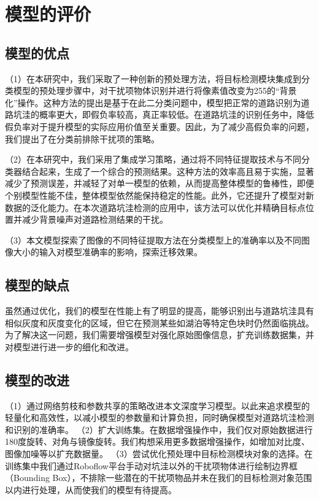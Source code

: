 \documentclass[a4paper, 10pt]{article}
\begin{document}
	\section{模型的评价}
	
	\subsection{模型的优点}
	
	（1）在本研究中，我们采取了一种创新的预处理方法，将目标检测模块集成到分类模型的预处理步骤中，对干扰项物体识别并进行将像素值改变为255的“背景化”操作。这种方法的提出是基于在此二分类问题中，模型把正常的道路识别为道路坑洼的概率更大，即假负率较高，真正率较低。在道路坑洼的识别任务中，降低假负率对于提升模型的实际应用价值至关重要。因此，为了减少高假负率的问题，我们提出了在分类前排除干扰项的策略。
	
	（2）在本研究中，我们采用了集成学习策略，通过将不同特征提取技术与不同分类器结合起来，生成了一个综合的预测结果。这种方法的效率高且易于实施，显著减少了预测误差，并减轻了对单一模型的依赖，从而提高整体模型的鲁棒性，即便个别模型性能不佳，整体模型依然能保持稳定的性能。此外，它还提升了模型对新数据的泛化能力。在本次道路坑洼检测的应用中，该方法可以优化并精确目标点位置并减少背景噪声对道路检测结果的干扰。
	
	（3）本文模型探索了图像的不同特征提取方法在分类模型上的准确率以及不同图像大小的输入对模型准确率的影响，探索迁移效果。
	
	
	\subsection{模型的缺点}
	
	虽然通过优化，我们的模型在性能上有了明显的提高，能够识别出与道路坑洼具有相似灰度和灰度变化的区域，但它在预测某些如湖泊等特定色块时仍然面临挑战。为了解决这一问题，我们需要增强模型对强化原始图像信息，扩充训练数据集，并对模型进行进一步的细化和改进。
	
	
	\subsection{模型的改进}

	（1）通过网络剪枝和参数共享的策略改进本文深度学习模型。以此来追求模型的轻量化和高效性，以减小模型的参数量和计算负担，同时确保模型对道路坑洼检测和识别的准确率。
	（2）扩大训练集。在数据增强操作中，我们仅对原始数据进行180度旋转、对角与镜像旋转。我们构想采用更多数据增强操作，如增加对比度、图像加噪等以扩充数据量。
	（3）尝试优化预处理中目标检测模块对象的选择。在训练集中我们通过Roboflow平台手动对坑洼以外的干扰项物体进行绘制边界框（Bounding Box），不排除一些潜在的干扰项物品并未在我们的目标检测对象范围以内进行处理，从而使我们的模型有待提高。
	
\end{document}
